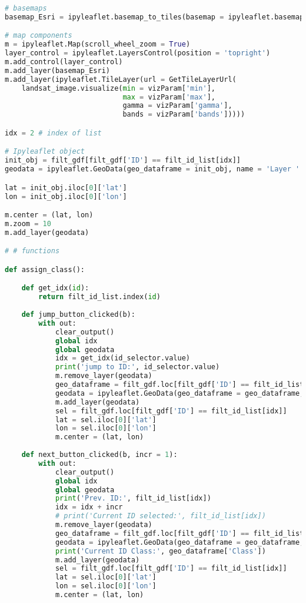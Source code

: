 \begin{lstlisting}[language=Python]
# basemaps
basemap_Esri = ipyleaflet.basemap_to_tiles(basemap = ipyleaflet.basemaps.Esri.WorldImagery)

# map components
m = ipyleaflet.Map(scroll_wheel_zoom = True)
layer_control = ipyleaflet.LayersControl(position = 'topright')
m.add_control(layer_control)
m.add_layer(basemap_Esri)
m.add_layer(ipyleaflet.TileLayer(url = GetTileLayerUrl(
    landsat_image.visualize(min = vizParam['min'], 
                            max = vizParam['max'], 
                            gamma = vizParam['gamma'], 
                            bands = vizParam['bands']))))

idx = 2 # index of list

# Ipyleaflet object
init_obj = filt_gdf[filt_gdf['ID'] == filt_id_list[idx]]
geodata = ipyleaflet.GeoData(geo_dataframe = init_obj, name = 'Layer ' + str(filt_id_list[idx]))

lat = init_obj.iloc[0]['lat']
lon = init_obj.iloc[0]['lon']

m.center = (lat, lon)
m.zoom = 10
m.add_layer(geodata)

# # functions

def assign_class():

    def get_idx(id):
        return filt_id_list.index(id)
    
    def jump_button_clicked(b):
        with out:
            clear_output()
            global idx
            global geodata
            idx = get_idx(id_selector.value)
            print('jump to ID:', id_selector.value)
            m.remove_layer(geodata)
            geo_dataframe = filt_gdf.loc[filt_gdf['ID'] == filt_id_list[idx]]
            geodata = ipyleaflet.GeoData(geo_dataframe = geo_dataframe, name = 'Layer ' + str(filt_id_list[idx]))
            m.add_layer(geodata)
            sel = filt_gdf.loc[filt_gdf['ID'] == filt_id_list[idx]]
            lat = sel.iloc[0]['lat']
            lon = sel.iloc[0]['lon']
            m.center = (lat, lon)
        
    def next_button_clicked(b, incr = 1):
        with out:
            clear_output()
            global idx
            global geodata
            print('Prev. ID:', filt_id_list[idx])
            idx = idx + incr
            # print('Current ID selected:', filt_id_list[idx])
            m.remove_layer(geodata)
            geo_dataframe = filt_gdf.loc[filt_gdf['ID'] == filt_id_list[idx]]
            geodata = ipyleaflet.GeoData(geo_dataframe = geo_dataframe, name = 'Layer ' + str(filt_id_list[idx]))
            print('Current ID Class:', geo_dataframe['Class'])
            m.add_layer(geodata)
            sel = filt_gdf.loc[filt_gdf['ID'] == filt_id_list[idx]]
            lat = sel.iloc[0]['lat']
            lon = sel.iloc[0]['lon']
            m.center = (lat, lon)
    

\end{lstlisting}
